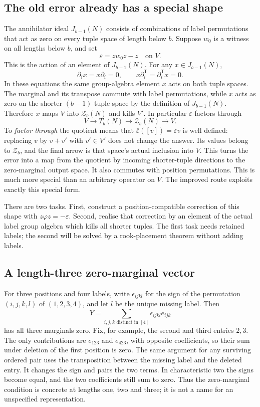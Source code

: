 \documentclass[11pt,a4paper,oneside,openany]{book}
\theoremstyle{definition}\newtheorem{definition}[theorem]{Definition}
\theoremstyle{remark}\newtheorem{remark}[theorem]{Remark}
\numberwithin{equation}{chapter}
\begin{document}
\subsection{The old error already has a special shape}
The annihilator ideal $J_{b-1}(N)$ consists of combinations of label
permutations that act as zero on every tuple space of length below $b$.
Suppose $w_0$ is a witness on all lengths below $b$, and set
\[\varepsilon=zw_0z-z\quad\text{on }V.\]
This is the action of an element of $J_{b-1}(N)$. For any $x\in J_{b-1}(N)$,
\[\partial_i x=x\partial_i=0,\qquad x\partial_i^{\mathsf T}=\partial_i^{\mathsf T}x=0.
\]
In these equations the same group-algebra element $x$ acts on both
tuple spaces. The marginal and its transpose commute with label
permutations, while $x$ acts as zero on the shorter $(b-1)$-tuple
space by the definition of $J_{b-1}(N)$.
Therefore $x$ maps $V$ into $\mathcal Z_b(N)$ and kills $V'$. In particular $\varepsilon$ factors through
\[V\longrightarrow T_b(N)\longrightarrow \mathcal Z_b(N)\longrightarrow V.
\]
To \emph{factor through} the quotient means that
$\bar\varepsilon([v])=\varepsilon v$ is well defined: replacing $v$
by $v+v'$ with $v'\in V'$ does not change the answer. Its values
belong to $\mathcal Z_b$, and the final arrow is that space's actual
inclusion into $V$. This turns the error into a map from the quotient
by incoming shorter-tuple directions to the zero-marginal output space.
It also commutes with position permutations. This is much more special than an arbitrary operator on $V$. The improved route exploits exactly this special form.

There are two tasks. First, construct a position-compatible correction of this shape with $z\varphi z=-\varepsilon$. Second, realise that correction by an element of the actual label group algebra which kills all shorter tuples. The first task needs retained labels; the second will be solved by a rook-placement theorem without adding labels.

\subsection{A length-three zero-marginal vector}
For three positions and four labels, write
$\epsilon_{ijkl}$ for the sign of the permutation $(i,j,k,l)$
of $(1,2,3,4)$, and let $l$ be the unique missing label. Then
\[
           Y=\sum_{i,j,k\text{ distinct in }[4]}
                        \epsilon_{ijkl}e_{ijk}
\]
has all three marginals zero. Fix, for example, the second and third
entries $2,3$. The only contributions are $e_{123}$ and $e_{423}$,
with opposite coefficients, so their sum under deletion of the first
position is zero. The same argument for any surviving ordered pair
uses the transposition between the missing label and the deleted
entry. It changes the sign and pairs the two terms. In characteristic
two the signs become equal, and the two coefficients still sum to
zero. Thus the zero-marginal condition is concrete at lengths one,
two and three; it is not a name for an unspecified representation.
\end{document}
